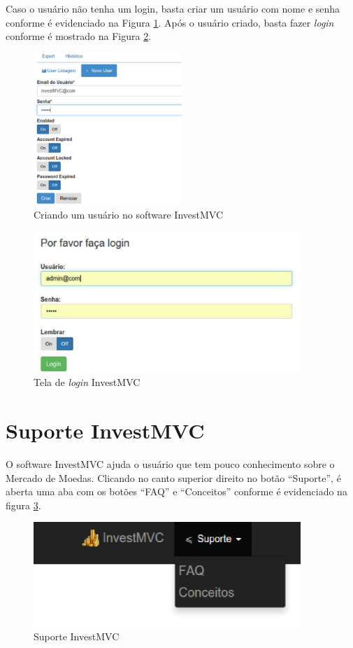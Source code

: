 Caso o usuário não tenha um login, basta criar um usuário com nome e senha conforme é evidenciado na Figura \ref{novoUser}. Após o usuário criado, basta fazer \textit{login} conforme é mostrado na Figura \ref{login}.

\begin{figure}[H]
\centering
\includegraphics[width=0.5\textwidth]{figuras/novoUser}
\caption{Criando um usuário no software InvestMVC}
\label{novoUser}
\end{figure}

\begin{figure}[H]
\centering
\includegraphics[width=0.9\textwidth]{figuras/login}
\caption{Tela de \textit{login} InvestMVC}
\label{login}
\end{figure}

\section{Suporte InvestMVC}
O software InvestMVC ajuda o usuário que tem pouco conhecimento sobre o Mercado de Moedas. Clicando no canto superior direito no botão “Suporte”, é aberta uma aba com os botões “FAQ” e “Conceitos” conforme é evidenciado na figura \ref{navSuporte}.

\begin{figure}[H]
\centering
\includegraphics[width=0.9\textwidth]{figuras/navSuporte}
\caption{Suporte InvestMVC}
\label{navSuporte}
\end{figure}

